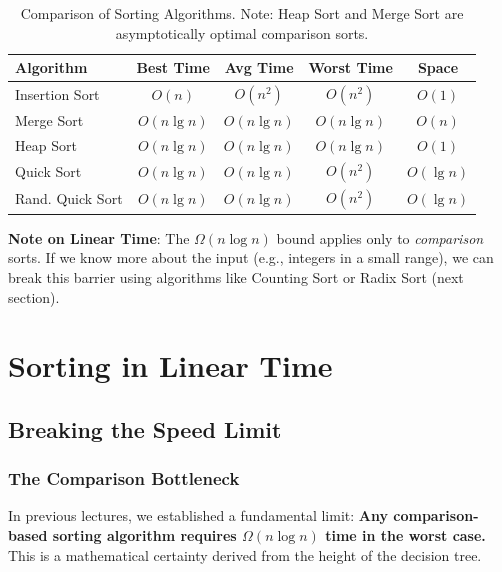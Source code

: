 \documentclass[12pt]{article}
\theoremstyle{blueplain}
\theoremstyle{bluedef}
\theoremstyle{blueremark}
\begin{document}
\begin{table}[h]
    \centering
    \begin{tabular}{|l|c|c|c|c|}
        \hline
        \textbf{Algorithm} & \textbf{Best Time} & \textbf{Avg Time} & \textbf{Worst Time} & \textbf{Space} \\ \hline
        Insertion Sort     & $O(n)$             & $O(n^2)$          & $O(n^2)$            & $O(1)$         \\ \hline
        Merge Sort         & $O(n \lg n)$       & $O(n \lg n)$      & $O(n \lg n)$        & $O(n)$         \\ \hline
        Heap Sort          & $O(n \lg n)$       & $O(n \lg n)$      & $O(n \lg n)$        & $O(1)$         \\ \hline
        Quick Sort         & $O(n \lg n)$       & $O(n \lg n)$      & $O(n^2)$            & $O(\lg n)$     \\ \hline
        Rand. Quick Sort   & $O(n \lg n)$       & $O(n \lg n)$      & $O(n^2)$            & $O(\lg n)$     \\ \hline
    \end{tabular}
    \caption{Comparison of Sorting Algorithms. Note: Heap Sort and Merge Sort are asymptotically optimal comparison sorts.}
\end{table}

\textbf{Note on Linear Time}: The $\Omega(n \log n)$ bound applies only to \textit{comparison} sorts. If we know more about the input (e.g., integers in a small range), we can break this barrier using algorithms like Counting Sort or Radix Sort (next section).

\clearpage


\section{Sorting in Linear Time}

\subsection{Breaking the Speed Limit}

\subsubsection{The Comparison Bottleneck}
In previous lectures, we established a fundamental limit: \textbf{Any comparison-based sorting algorithm requires $\Omega(n \log n)$ time in the worst case.} This is a mathematical certainty derived from the height of the decision tree.
\end{document}
